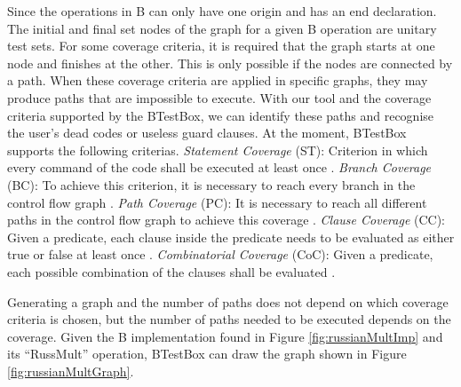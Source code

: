 \documentclass[runningheads]{llncs}
\begin{document}

Since the operations in B can only have one origin and has an end declaration. The initial and final set nodes of the graph for a given B operation are unitary test sets. For some coverage criteria, it is required that the graph starts at one node and finishes at the other. This is only possible if the nodes are connected by a path. When these coverage criteria are applied in specific graphs, they may produce paths that are impossible to execute. With our tool and the coverage criteria supported by the BTestBox, we can identify these paths and recognise the user's dead codes or useless guard clauses. At the moment, BTestBox supports the following criterias. \textit{Statement Coverage} (ST): Criterion in which every command of the code shall be executed at least once \cite{ammann2008introduction}. \textit{Branch Coverage} (BC): To achieve this criterion, it is necessary to reach every branch in the control flow graph \cite{ammann2008introduction}. \textit{Path Coverage} (PC): It is necessary to reach all different paths in the control flow graph to achieve this coverage \cite{ammann2008introduction}. \textit{Clause Coverage} (CC): Given a predicate, each clause inside the predicate needs to be evaluated as either true or false at least once \cite{ammann2003coverage}. \textit{Combinatorial Coverage} (CoC): Given a predicate, each possible combination of the clauses shall be evaluated \cite{ammann2003coverage}.

Generating a graph and the number of paths does not depend on which coverage criteria is chosen, but the number of paths needed to be executed depends on the coverage. Given the B implementation found in Figure \ref{fig:russianMultImp} and its ``RussMult'' operation, BTestBox can draw the graph shown in Figure \ref{fig:russianMultGraph}.

        
\end{document}
